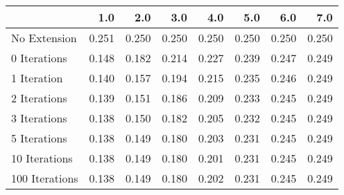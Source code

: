 \begin{tabular}{lrrrrrrr}
\toprule
{} &   1.0 &   2.0 &   3.0 &   4.0 &   5.0 &   6.0 &   7.0 \\
\midrule
No Extension   & 0.251 & 0.250 & 0.250 & 0.250 & 0.250 & 0.250 & 0.250 \\
0 Iterations   & 0.148 & 0.182 & 0.214 & 0.227 & 0.239 & 0.247 & 0.249 \\
1 Iteration    & 0.140 & 0.157 & 0.194 & 0.215 & 0.235 & 0.246 & 0.249 \\
2 Iterations   & 0.139 & 0.151 & 0.186 & 0.209 & 0.233 & 0.245 & 0.249 \\
3 Iterations   & 0.138 & 0.150 & 0.182 & 0.205 & 0.232 & 0.245 & 0.249 \\
5 Iterations   & 0.138 & 0.149 & 0.180 & 0.203 & 0.231 & 0.245 & 0.249 \\
10 Iterations  & 0.138 & 0.149 & 0.180 & 0.201 & 0.231 & 0.245 & 0.249 \\
100 Iterations & 0.138 & 0.149 & 0.180 & 0.202 & 0.231 & 0.245 & 0.249 \\
\bottomrule
\end{tabular}
